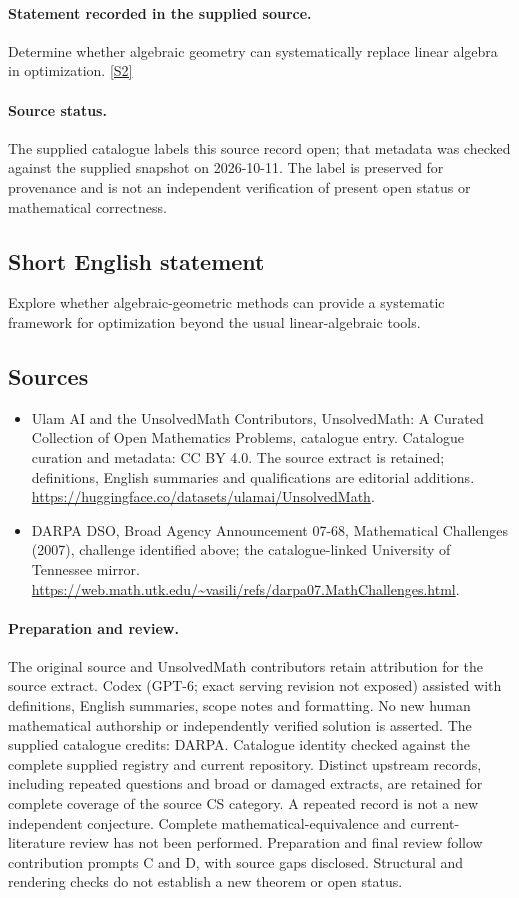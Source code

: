 \documentclass[11pt]{article}
\begin{document}
\paragraph{Statement recorded in the supplied source.}
Determine whether algebraic geometry can systematically replace linear algebra in optimization. \href{https://web.math.utk.edu/~vasili/refs/darpa07.MathChallenges.html}{[S2]}
\paragraph{Source status.}
The supplied catalogue labels this source record open; that metadata was checked against the supplied snapshot on 2026-10-11. The label is preserved for provenance and is not an independent verification of present open status or mathematical correctness.
\subsection{Short English statement}
Explore whether algebraic-geometric methods can provide a systematic framework for optimization beyond the usual linear-algebraic tools.
\subsection{Sources}
\begin{itemize}
\item[S1] Ulam AI and the UnsolvedMath Contributors, UnsolvedMath: A Curated Collection of Open Mathematics Problems, catalogue entry. Catalogue curation and metadata: CC BY 4.0. The source extract is retained; definitions, English summaries and qualifications are editorial additions.
\url{https://huggingface.co/datasets/ulamai/UnsolvedMath}.
\item[S2] DARPA DSO, Broad Agency Announcement 07-68, Mathematical Challenges (2007), challenge identified above; the catalogue-linked University of Tennessee mirror.
\url{https://web.math.utk.edu/~vasili/refs/darpa07.MathChallenges.html}.
\end{itemize}
\paragraph{Preparation and review.}
The original source and UnsolvedMath contributors retain attribution for the source extract. Codex (GPT-6; exact serving revision not exposed) assisted with definitions, English summaries, scope notes and formatting. No new human mathematical authorship or independently verified solution is asserted. The supplied catalogue credits: DARPA. Catalogue identity checked against the complete supplied registry and current repository. Distinct upstream records, including repeated questions and broad or damaged extracts, are retained for complete coverage of the source CS category. A repeated record is not a new independent conjecture. Complete mathematical-equivalence and current-literature review has not been performed. Preparation and final review follow contribution prompts C and D, with source gaps disclosed. Structural and rendering checks do not establish a new theorem or open status.
\label{end:statement}
\end{document}

